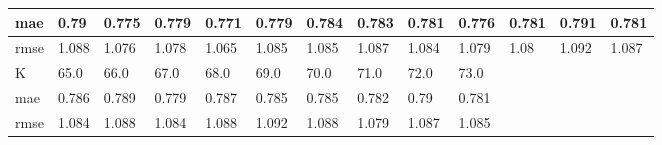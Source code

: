 \begin{appendices}
\begin{center}
\begin{tabularx}{\textwidth}{|l|X|X|X|X|X|X|X|X|X|X|X|X|}
		mae & 0.79 & 0.775 & 0.779 & 0.771 & 0.779 & 0.784 & 0.783 & 0.781 & 0.776 & 0.781 & 0.791 & 0.781 \\ \hline 
		rmse & 1.088 & 1.076 & 1.078 & 1.065 & 1.085 & 1.085 & 1.087 & 1.084 & 1.079 & 1.08 & 1.092 & 1.087 \\ \hline 
		\hline 
		K & 65.0 & 66.0 & 67.0 & 68.0 & 69.0 & 70.0 & 71.0 & 72.0 & 73.0  & & & \\ \hline 
		mae & 0.786 & 0.789 & 0.779 & 0.787 & 0.785 & 0.785 & 0.782 & 0.79 & 0.781 & & &  \\ \hline 
		rmse & 1.084 & 1.088 & 1.084 & 1.088 & 1.092 & 1.088 & 1.079 & 1.087 & 1.085  & & & \\ \hline 
	\end{tabularx} 
\end{center}


\end{appendices}
